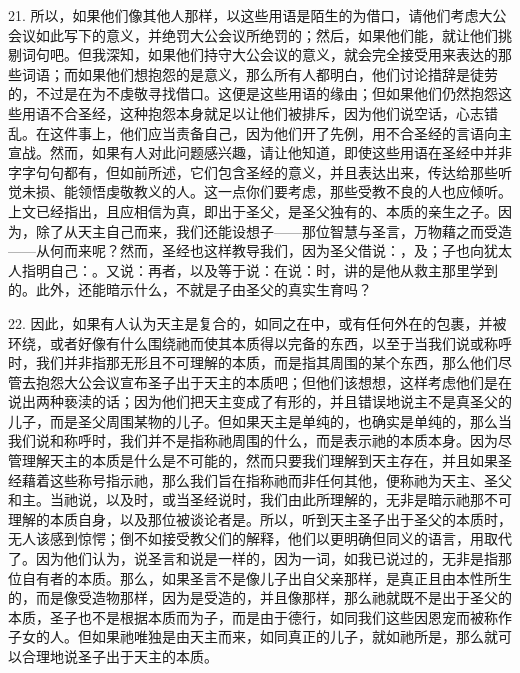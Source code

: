 21. 所以，如果他们像其他人那样，以这些用语是陌生的为借口，请他们考虑大公会议如此写下的意义，并绝罚大公会议所绝罚的；然后，如果他们能，就让他们挑剔词句吧。但我深知，如果他们持守大公会议的意义，就会完全接受用来表达的那些词语；而如果他们想抱怨的是意义，那么所有人都明白，他们讨论措辞是徒劳的，不过是在为不虔敬寻找借口。这便是这些用语的缘由；但如果他们仍然抱怨这些用语不合圣经，这种抱怨本身就足以让他们被排斥，因为他们说空话，心志错乱。在这件事上，他们应当责备自己，因为他们开了先例，用不合圣经的言语向主宣战。然而，如果有人对此问题感兴趣，请让他知道，即使这些用语在圣经中并非字字句句都有，但如前所述，它们包含圣经的意义，并且表达出来，传达给那些听觉未损、能领悟虔敬教义的人。这一点你们要考虑，那些受教不良的人也应倾听。上文已经指出，且应相信为真，即出于圣父，是圣父独有的、本质的亲生之子。因为，除了从天主自己而来，我们还能设想子——那位智慧与圣言，万物藉之而受造——从何而来呢？然而，圣经也这样教导我们，因为圣父借说：，及；子也向犹太人指明自己：。又说：再者，以及等于说：在说：时，讲的是他从救主那里学到的。此外，还能暗示什么，不就是子由圣父的真实生育吗？\par

22. 因此，如果有人认为天主是复合的，如同之在中，或有任何外在的包裹，并被环绕，或者好像有什么围绕祂而使其本质得以完备的东西，以至于当我们说或称呼时，我们并非指那无形且不可理解的本质，而是指其周围的某个东西，那么他们尽管去抱怨大公会议宣布圣子出于天主的本质吧；但他们该想想，这样考虑他们是在说出两种亵渎的话；因为他们把天主变成了有形的，并且错误地说主不是真圣父的儿子，而是圣父周围某物的儿子。但如果天主是单纯的，也确实是单纯的，那么当我们说和称呼时，我们并不是指称祂周围的什么，而是表示祂的本质本身。因为尽管理解天主的本质是什么是不可能的，然而只要我们理解到天主存在，并且如果圣经藉着这些称号指示祂，那么我们旨在指称祂而非任何其他，便称祂为天主、圣父和主。当祂说，以及时，或当圣经说时，我们由此所理解的，无非是暗示祂那不可理解的本质自身，以及那位被谈论者是。所以，听到天主圣子出于圣父的本质时，无人该感到惊愕；倒不如接受教父们的解释，他们以更明确但同义的语言，用取代了。因为他们认为，说圣言和说是一样的，因为一词，如我已说过的，无非是指那位自有者的本质。那么，如果圣言不是像儿子出自父亲那样，是真正且由本性所生的，而是像受造物那样，因为是受造的，并且像那样，那么祂就既不是出于圣父的本质，圣子也不是根据本质而为子，而是由于德行，如同我们这些因恩宠而被称作子女的人。但如果祂唯独是由天主而来，如同真正的儿子，就如祂所是，那么就可以合理地说圣子出于天主的本质。\par

